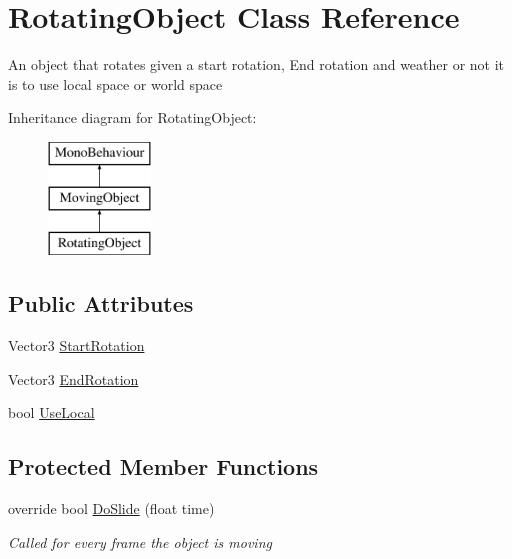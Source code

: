 \hypertarget{class_rotating_object}{}\section{Rotating\+Object Class Reference}
\label{class_rotating_object}


An object that rotates given a start rotation, End rotation and weather or not it is to use local space or world space  


Inheritance diagram for Rotating\+Object\+:\begin{figure}[H]
\begin{center}
\leavevmode
\includegraphics[height=3.000000cm]{class_rotating_object}
\end{center}
\end{figure}
\subsection*{Public Attributes}
\begin{DoxyCompactItemize}
\item 
Vector3 \mbox{\hyperlink{class_rotating_object_a4e222e799b7677eddc0a918a058e2fd2}{Start\+Rotation}}
\item 
Vector3 \mbox{\hyperlink{class_rotating_object_a7311109e5270d856b0bdeb7048aa12d1}{End\+Rotation}}
\item 
bool \mbox{\hyperlink{class_rotating_object_a4416e2ce945d946eccb9f10b5129c3e6}{Use\+Local}}
\end{DoxyCompactItemize}
\subsection*{Protected Member Functions}
\begin{DoxyCompactItemize}
\item 
override bool \mbox{\hyperlink{class_rotating_object_ac1d4caba5c9e39d48195c8b1bc1eb9d0}{Do\+Slide}} (float time)
\begin{DoxyCompactList}\small\item\em Called for every frame the object is moving \end{DoxyCompactList}\end{DoxyCompactItemize}
